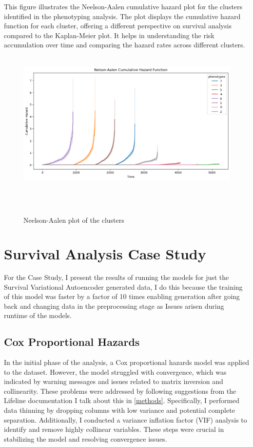 \noindent This figure illustrates the Neelson-Aalen cumulative hazard plot for the clusters identified in the phenotyping analysis. The plot displays the cumulative hazard function for each cluster, offering a different perspective on survival analysis compared to the Kaplan-Meier plot. It helps in understanding the risk accumulation over time and comparing the hazard rates across different clusters.
\begin{figure}[h]
    \centering
    \includegraphics[scale=0.40]{Figures/EDA/cluster_neelson.png}
    \caption{Neelson-Aalen plot of the clusters}
    \label{fig:your_label}
\end{figure}


\section{Survival Analysis Case Study}
For the Case Study, I present the results of running the models for just the Survival Variational Autoencoder generated data, I do this because the training of this model was faster by a factor of 10 times enabling generation after going back and changing data in the preprocessing stage as Issues arisen during runtime of the models.

\subsection{Cox Proportional Hazards}
In the initial phase of the analysis, a Cox proportional hazards model was applied to the dataset. However, the model struggled with convergence, which was indicated by warning messages and issues related to matrix inversion and collinearity. These problems were addressed by following suggestions from the Lifeline documentation I talk about this in \ref{methods}. Specifically, I performed data thinning by dropping columns with low variance and potential complete separation. Additionally, I conducted a variance inflation factor (VIF) analysis to identify and remove highly collinear variables. These steps were crucial in stabilizing the model and resolving convergence issues.
\\\\

